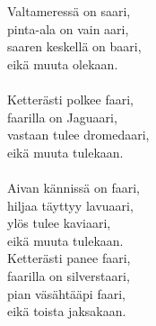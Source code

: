 
Valtameressä on saari, \\ pinta-ala on vain aari, \\ saaren keskellä on baari, \\ eikä muuta olekaan. \\ \hspace{10mm} \\ Ketterästi polkee faari, \\ faarilla on Jaguaari, \\ vastaan tulee dromedaari, \\ eikä muuta tulekaan. \\ \hspace{10mm} \\ Aivan kännissä on faari, \\ hiljaa täyttyy lavuaari, \\ ylös tulee kaviaari, \\ eikä muuta tulekaan. \\ Ketterästi panee faari, \\ faarilla on silverstaari, \\ pian väsähtääpi faari, \\ eikä toista jaksakaan.